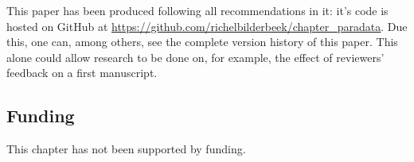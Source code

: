This paper has been produced following all recommendations in it:
it's \latex code is hosted on GitHub 
at \url{https://github.com/richelbilderbeek/chapter_paradata}.
Due this, one can, among others, see the complete version history of this paper.
This alone could allow research to be done on, for example,
the effect of reviewers' feedback on a first manuscript.

\subsection{Funding}

This chapter has not been supported by funding.
